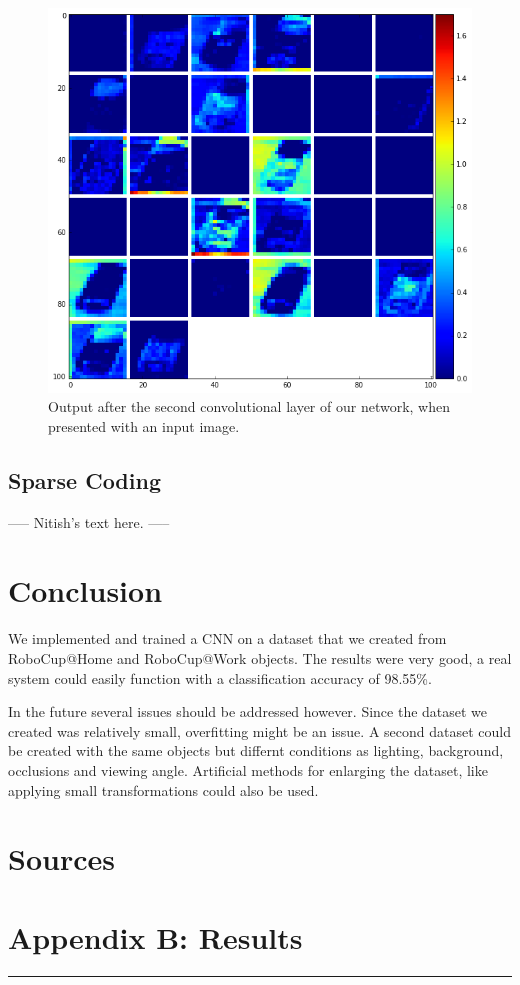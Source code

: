 \documentclass[	DIV=calc,%
				paper=a4,%
				fontsize=11pt,%
				twocolumn]{scrartcl}	 %
\newcommand{\HorRule}{\color{brsublue}%
					 \rule{\linewidth}{1pt}%
					 \color{black}
					 }
\begin{document}
\begin{figure}[H]
    \centering
    \includegraphics[width=0.8\linewidth]{data/final_cnn_secondlayer}
    \caption{Output after the second convolutional layer of our network, when presented with an input image.}
\end{figure}


\subsection*{Sparse Coding}
----- Nitish's text here. -----

\section{Conclusion}

We implemented and trained a CNN on a dataset that we created from RoboCup@Home and RoboCup@Work objects. The results were very good, a real system could easily function with a classification accuracy of 98.55\%. 

In the future several issues should be addressed however. Since the dataset we created was relatively small, overfitting might be an issue. A second dataset could be created with the same objects but differnt conditions as lighting, background, occlusions and viewing angle. Artificial methods for enlarging the dataset, like applying small transformations could also be used.

\newpage

\section*{Sources}

\newpage

\onecolumn

\section*{Appendix B: Results}

\HorRule
\end{document}
